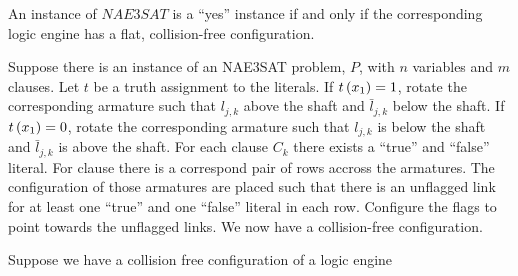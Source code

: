% 
% 
% 
\begin{thm}\label{thm:Satisfiability-1}
 An instance of $NAE3SAT$ is a ``yes'' instance if and only if the corresponding logic engine has a
flat, collision-free configuration.
\end{thm}
\begin{pf}
Suppose there is an instance of an NAE3SAT problem, $P$, with $n$ variables and $m$ clauses.  Let 
$t$ be a truth assignment to the literals.  If $t \left( x_1 \right) = 1$, rotate the corresponding armature 
such that $l_{j,k}$ above the shaft and $\bar{l}_{j,k}$ below the shaft.  If $t \left( x_1 \right) = 0$, 
rotate the corresponding armature such that $l_{j,k}$ is below the shaft and $\bar{l}_{j,k}$ is 
above the shaft.  For each clause $C_k$ there exists a ``true'' and ``false'' literal.  For clause 
there is a correspond pair of rows accross the armatures.  The configuration of those armatures are 
placed such that there is an unflagged link for at least one ``true'' and one ``false'' literal in 
each row.  Configure the flags to point towards the unflagged links. We now have a collision-free 
configuration.

Suppose we have a collision free configuration of a logic engine
\end{pf}

